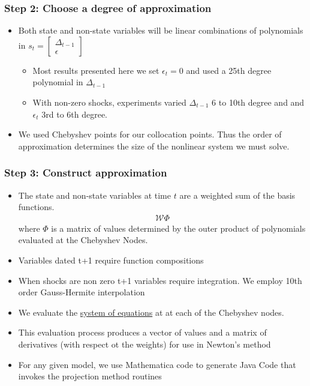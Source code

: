 \documentclass[tikz]{beamer}
\begin{document}
\begin{frame}

\frametitle{Step 2: Choose a degree of approximation }
\begin{itemize}
\item Both state and non-state variables will be linear combinations
  of polynomials in $s_t=
  \begin{bmatrix}
    \Delta_{t-1}\\ \epsilon
  \end{bmatrix}$
  \begin{itemize}
  \item Most results presented here we set $\epsilon_t=0$ and used a
    25th degree polynomial in $\Delta_{t-1}$
  \item With non-zero shocks, experiments varied $\Delta_{t-1}$ 6 to
    10th degree and and $\epsilon_t$ 3rd to 6th degree.
  \end{itemize}
\item We used Chebyshev points for our collocation points.  Thus the
  order of approximation determines the size of the nonlinear system
  we must solve.
\end{itemize}

\end{frame}
\begin{frame}

\frametitle{Step 3: Construct approximation}
\begin{itemize}
\item The state and non-state variables at time $t$ are a weighted sum
  of the basis functions.
  \begin{gather*}
    \mathcal{W} \Phi
  \end{gather*}
  where $\Phi$ is a matrix of values determined by the outer product
  of polynomials evaluated at the Chebyshev Nodes.
\item Variables dated t+1 require function compositions
\item When shocks are non zero t+1 variables require integration.  We
  employ 10th order Gauss-Hermite interpolation
\item We evaluate the \hyperref[eqns]{system of equations} at at each
  of the Chebyshev nodes.
\item This evaluation process produces a vector of values and a matrix
  of derivatives (with respect ot the weights) for use in Newton's
  method
\item For any given model, we use Mathematica code to generate Java
  Code that invokes the projection method routines
\end{itemize}



\end{frame}
\end{document}
